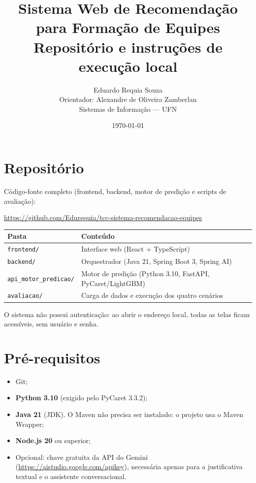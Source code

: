 \documentclass[12pt,a4paper]{article}
\title{Sistema Web de Recomendação para Formação de Equipes\\
\large Repositório e instruções de execução local}
\author{Eduardo Requia Souza \\ Orientador: Alexandre de Oliveira Zamberlan \\
Sistemas de Informação --- UFN}
\date{\today}
\begin{document}
\maketitle

\section{Repositório}

Código-fonte completo (frontend, backend, motor de predição e scripts de avaliação):

\begin{center}
\url{https://github.com/Edurequia/tcc-sistema-recomendacao-equipes}
\end{center}

\begin{tabular}{@{}ll@{}}
\toprule
Pasta & Conteúdo \\
\midrule
\texttt{frontend/} & Interface web (React + TypeScript) \\
\texttt{backend/} & Orquestrador (Java 21, Spring Boot 3, Spring AI) \\
\texttt{api\_motor\_predicao/} & Motor de predição (Python 3.10, FastAPI, PyCaret/LightGBM) \\
\texttt{avaliacao/} & Carga de dados e execução dos quatro cenários \\
\bottomrule
\end{tabular}

\medskip
O sistema não possui autenticação: ao abrir o endereço local, todas as telas ficam acessíveis, sem usuário e senha.

\section{Pré-requisitos}

\begin{itemize}[noitemsep]
  \item Git;
  \item \textbf{Python 3.10} (exigido pelo PyCaret 3.3.2);
  \item \textbf{Java 21} (JDK). O Maven não precisa ser instalado: o projeto usa o Maven Wrapper;
  \item \textbf{Node.js 20} ou superior;
  \item Opcional: chave gratuita da API do Gemini (\url{https://aistudio.google.com/apikey}), necessária apenas para a justificativa textual e o assistente conversacional.
\end{itemize}
\end{document}
